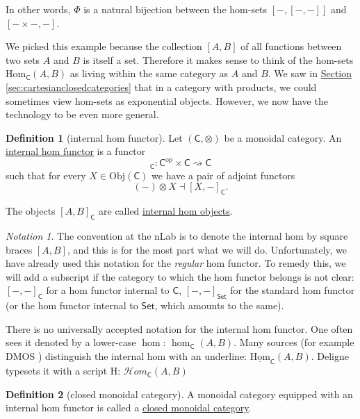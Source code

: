 \documentclass[a4paper]{report}
\newcommand{\defn}[1]{\ul{#1}}
\newcommand{\Obj}{\mathrm{Obj}}
\newcommand{\Hom}{\mathrm{Hom}}
\theoremstyle{definition}
\newtheorem{definition}{Definition}[section]
\theoremstyle{plain}
\theoremstyle{remark}
\newtheorem{notation}{Notation}[section]
\begin{document}
In other words, $\Phi$ is a natural bijection between the hom-sets $[-,[-,-]]$ and $[- \times -, -]$.

We picked this example because the collection $[A, B]$ of all functions between two sets $A$ and $B$ is itself a set. Therefore it makes sense to think of the hom-sets $\Hom_{\mathsf{C}}(A, B)$ as living within the same category as $A$ and $B$. We saw in \hyperref[sec:cartesianclosedcategories]{Section \ref*{sec:cartesianclosedcategories}} that in a category with products, we could sometimes view hom-sets as exponential objects. However, we now have the technology to be even more general.

\begin{definition}[internal hom functor]
  \label{def:internalhomfunctor}
  Let $(\mathsf{C}, \otimes)$ be a monoidal category. An \defn{internal hom functor} is a functor
  \begin{equation*}
    [-, -]_{\mathsf{C}}\colon \mathsf{C}^{\mathrm{op}} \times \mathsf{C} \rightsquigarrow \mathsf{C}
  \end{equation*}
  such that for every $X \in \Obj(\mathsf{C})$ we have a pair of adjoint functors
  \begin{equation*}
    (-) \otimes X \dashv [X, -]_{\mathsf{C}}.
  \end{equation*}

  The objects $[A, B]_{\mathsf{C}}$ are called \defn{internal hom objects}.
\end{definition}
\begin{notation}
  The convention at the nLab is to denote the internal hom by square braces $[A,B]$, and this is for the most part what we will do. Unfortunately, we have already used this notation for the \emph{regular} hom functor. To remedy this, we will add a subscript if the category to which the hom functor belongs is not clear: $[-,-]_{\mathsf{C}}$ for a hom functor internal to $\mathsf{C}$, $[-,-]_{\mathsf{Set}}$ for the standard hom functor (or the hom functor internal to $\mathsf{Set}$, which amounts to the same). 

  There is no universally accepted notation for the internal hom functor. One often sees it denoted by a lower-case $\hom$: $\hom_{\mathsf{C}}(A, B)$. Many sources (for example DMOS \cite{DMOS}) distinguish the internal hom with an underline: $\underline{\Hom}_{\mathsf{C}}(A, B)$. Deligne typesets it with a script H: $\mathscr{H}om_{\mathsf{C}}(A, B)$
\end{notation}

\begin{definition}[closed monoidal category]
  \label{def:closedmonoidalcategory}
  A monoidal category equipped with an internal hom functor is called a \defn{closed monoidal category}.
\end{definition}
\end{document}
